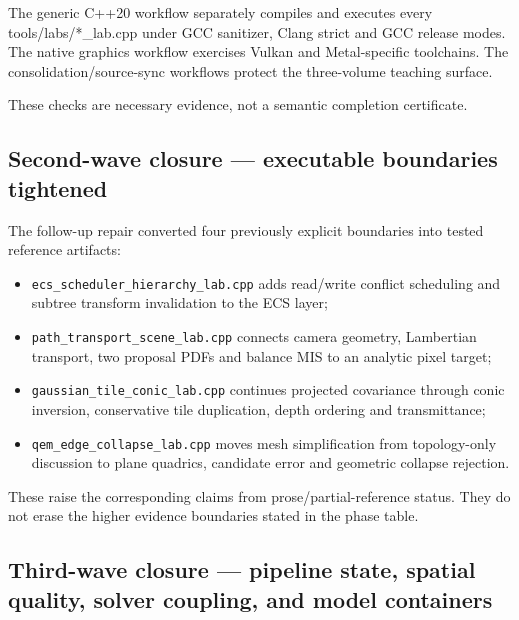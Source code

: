 The generic C++20 workflow separately compiles and executes every tools/labs/*\_lab.cpp under GCC sanitizer, Clang strict and GCC release modes. The native graphics workflow exercises Vulkan and Metal-specific toolchains. The consolidation/source-sync workflows protect the three-volume teaching surface.

These checks are necessary evidence, not a semantic completion certificate.

\subsection{Second-wave closure --- executable boundaries tightened}\label{appendix-2358b21a702d-second-wave-closure-executable-boundaries-tightened}

\hypertarget{appendix-2358b21a702d-second-wave-closure-executable-boundaries-tightened}{}

The follow-up repair converted four previously explicit boundaries into tested reference artifacts:

\begin{itemize}
\tightlist
\item
  \texttt{ecs\_scheduler\_hierarchy\_lab.cpp} adds read/write conflict scheduling and subtree transform invalidation to the ECS layer;
\item
  \texttt{path\_transport\_scene\_lab.cpp} connects camera geometry, Lambertian transport, two proposal PDFs and balance MIS to an analytic pixel target;
\item
  \texttt{gaussian\_tile\_conic\_lab.cpp} continues projected covariance through conic inversion, conservative tile duplication, depth ordering and transmittance;
\item
  \texttt{qem\_edge\_collapse\_lab.cpp} moves mesh simplification from topology-only discussion to plane quadrics, candidate error and geometric collapse rejection.
\end{itemize}

These raise the corresponding claims from prose/partial-reference status. They do not erase the higher evidence boundaries stated in the phase table.

\subsection{Third-wave closure --- pipeline state, spatial quality, solver coupling, and model containers}\label{appendix-2358b21a702d-third-wave-closure-pipeline-state-spatial-quality-solver-coupling-and-model-containers}

